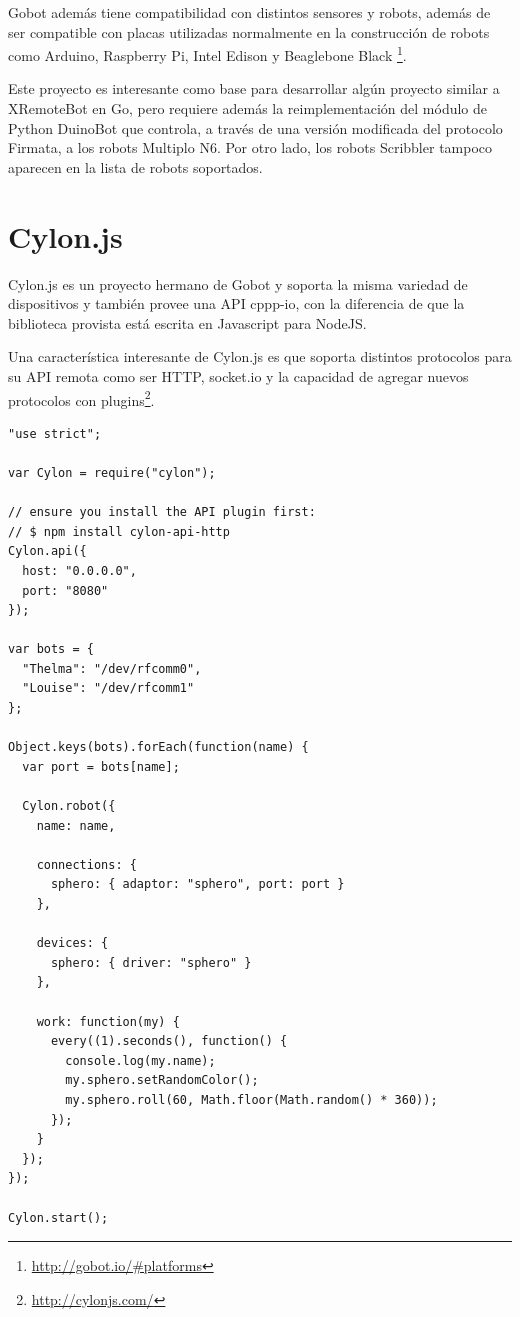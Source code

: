 Gobot además tiene compatibilidad con distintos sensores y robots, además de
ser compatible con
placas utilizadas normalmente en la construcción de robots como Arduino,
Raspberry Pi, Intel Edison y Beaglebone Black%
\footnote{\url{http://gobot.io/\#platforms}}.

Este proyecto es interesante como base para desarrollar algún proyecto
similar a XRemoteBot en Go, pero requiere además la reimplementación
del módulo de Python DuinoBot que controla, a través de una versión
modificada del protocolo Firmata, a los robots Multiplo N6. Por otro
lado, los robots Scribbler tampoco aparecen en la lista de robots soportados.

\section{Cylon.js}

Cylon.js es un proyecto hermano de Gobot y soporta la misma variedad
de dispositivos y también provee una API cppp-io, con la diferencia
de que la biblioteca provista está escrita en Javascript para NodeJS.

Una característica interesante de Cylon.js es que soporta distintos
protocolos para su API remota como ser HTTP, socket.io y la capacidad
de agregar nuevos protocolos con
plugins\footnote{\url{http://cylonjs.com/}}.

\begin{lstlisting}[caption={Cylon.js controlando 2 robots ``sphero'' usando HTTP},
label={lst:cylonjs_ejemplo}]
"use strict";

var Cylon = require("cylon");

// ensure you install the API plugin first:
// $ npm install cylon-api-http
Cylon.api({
  host: "0.0.0.0",
  port: "8080"
});

var bots = {
  "Thelma": "/dev/rfcomm0",
  "Louise": "/dev/rfcomm1"
};

Object.keys(bots).forEach(function(name) {
  var port = bots[name];

  Cylon.robot({
    name: name,

    connections: {
      sphero: { adaptor: "sphero", port: port }
    },

    devices: {
      sphero: { driver: "sphero" }
    },

    work: function(my) {
      every((1).seconds(), function() {
        console.log(my.name);
        my.sphero.setRandomColor();
        my.sphero.roll(60, Math.floor(Math.random() * 360));
      });
    }
  });
});

Cylon.start();
\end{lstlisting}

